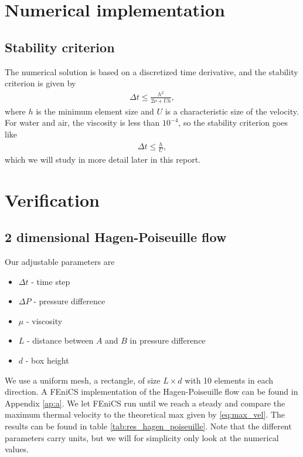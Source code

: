 \documentclass[a4paper,10pt]{article}
\renewcommand{\(}{\left(}
\renewcommand{\)}{\right)}
\begin{document}
\section{Numerical implementation}
\subsection{Stability criterion}
The numerical solution is based on a discretized time derivative, and the stability criterion is given by \cite{ns_numerical_solutions}
\begin{align*}
  \Delta t \leq \frac{h^2}{2\nu + Uh},
\end{align*}
where $h$ is the minimum element size and $U$ is a characteristic size of the velocity. For water and air, the viscosity is less than $10^{-4}$, so the stability criterion goes like
\begin{align*}
  \Delta t \leq \frac{h}{U},
\end{align*}
which we will study in more detail later in this report.

\section{Verification}
\subsection{2 dimensional Hagen-Poiseuille flow}
Our adjustable parameters are
\begin{itemize}
\item $\Delta t$ - time step
\item $\Delta P$ - pressure difference
\item $\mu$ - viscosity
\item $L$ - distance between $A$ and $B$ in pressure difference
\item $d$ - box height
\end{itemize}
We use a uniform mesh, a rectangle, of size $L\times d$ with 10 elements in each direction. A FEniCS implementation of the Hagen-Poiseuille flow can be found in Appendix \ref{ap:a}. We let FEniCS run until we reach a steady and compare the maximum thermal velocity to the theoretical max given by \eqref{eq:max_vel}. The results can be found in table \ref{tab:res_hagen_poiseuille}. Note that the different parameters carry units, but we will for simplicity only look at the numerical values.
\end{document}
